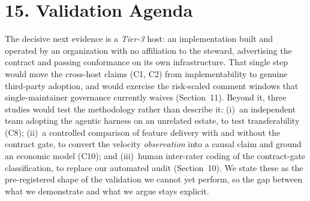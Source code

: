 \documentclass[11pt]{article}
\begin{document}
\section*{15. Validation Agenda}
The decisive next evidence is a \emph{Tier-3} host: an implementation built and operated by an
organization with no affiliation to the steward, advertising the contract and passing conformance on
its own infrastructure. That single step would move the cross-host claims (C1, C2) from
implementability to genuine third-party adoption, and would exercise the risk-scaled comment windows
that single-maintainer governance currently waives (Section~11). Beyond it, three studies would test
the methodology rather than describe it: (i)~an independent team adopting the agentic harness on an
unrelated estate, to test transferability (C8); (ii)~a controlled comparison of feature delivery with
and without the contract gate, to convert the velocity \emph{observation} into a causal claim and
ground an economic model (C10); and (iii)~human inter-rater coding of the contract-gate
classification, to replace our automated audit (Section~10). We state these as the pre-registered shape
of the validation we cannot yet perform, so the gap between what we demonstrate and what we argue stays
explicit.
\end{document}
